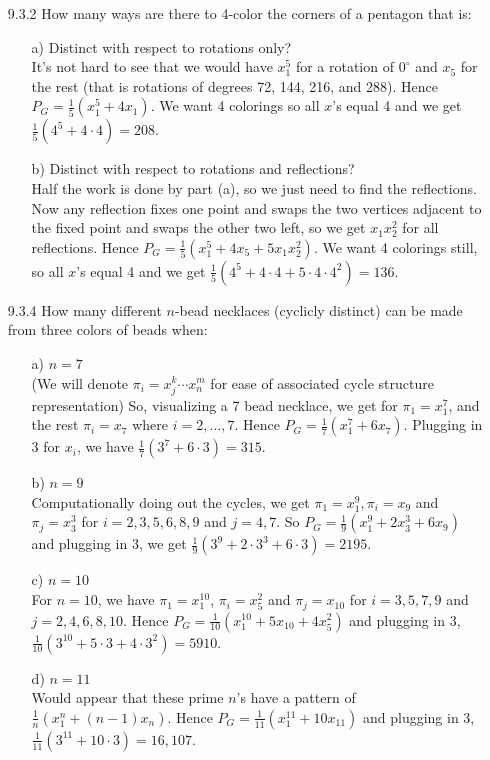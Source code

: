 \documentclass[12pt]{article}
\begin{document}
\begin{enumerate}
\item[9.3.2] How many ways are there to 4-color the corners of a pentagon that is:
\begin{enumerate}
\item[a)] Distinct with respect to rotations only? \\
It's not hard to see that we would have $x_1^5$ for a rotation of 
$0^{\circ}$ and $x_5$ for the rest (that is rotations of degrees 72, 144, 216, and 288).
Hence $P_G = \frac{1}{5}(x_1^5 + 4x_1)$. We want 4 colorings so all $x$'s equal 4 and we get
$\frac{1}{5}(4^5 + 4 \cdot 4) = 208$.
\item[b)] Distinct with respect to rotations and reflections? \\
Half the work is done by part (a), so we just need to find the reflections. 
Now any reflection fixes one point and swaps the two vertices adjacent to the fixed point
and swaps the other two left, so we get $x_1x_2^2$ for all reflections. Hence
$P_G = \frac{1}{5}(x_1^5 + 4x_5 + 5x_1x_2^2)$. We want 4 colorings still, so all $x$'s 
equal 4 and we get $\frac{1}{5}(4^5 + 4 \cdot 4 + 5 \cdot 4 \cdot 4^2) = 136$.
\end{enumerate}

\item[9.3.4] How many different $n$-bead necklaces (cyclicly distinct) can be made from three colors of beads when:
\begin{enumerate}
\item[a)] $n = 7$ \\
(We will denote $\pi_i = x_j^k\cdots x_n^m$ for ease of associated
cycle structure representation)
So, visualizing a 7 bead necklace, we get for $\pi_1 = x_1^7$, 
and the rest $\pi_i = x_7$ where $i = 2, \ldots, 7$. Hence
$P_G = \frac{1}{7}(x_1^7 + 6x_7)$. Plugging in 3 for $x_i$, we have
$\frac{1}{7}(3^7 + 6\cdot 3) = 315$.
\item[b)] $n = 9$ \\
Computationally doing out the cycles, we get $\pi_1 = x_1^9, 
\pi_i = x_9$ and $\pi_j = x_3^3$ for $i = 2, 3, 5, 6, 8, 9$ and
$j = 4, 7$. So $P_G = \frac{1}{9}(x_1^9 + 2x_3^3 + 6x_9)$ and plugging in 3, we get
$\frac{1}{9}(3^9 + 2\cdot 3^3 + 6\cdot 3) = 2195$.
\item[c)] $n = 10$ \\
For $n = 10$, we have
$\pi_1 = x_1^{10}$, $\pi_i = x^2_5$ and $\pi_j = x_{10}$ for $i = 3, 5, 7, 9$ and
$j = 2, 4, 6, 8, 10$. Hence $P_G = \frac{1}{10}(x_1^{10} + 5x_{10} + 4x_5^2)$ and
plugging in 3, $\frac{1}{10}(3^{10} + 5\cdot 3 + 4\cdot 3^2) = 5910$.
\item[d)] $n = 11$ \\
Would appear that these prime $n$'s have a pattern of 
$\frac{1}{n}(x_1^n + (n-1)x_n)$. Hence $P_G = \frac{1}{11}(x_1^{11} + 10x_{11})$ and
plugging in 3, $\frac{1}{11}(3^11 + 10 \cdot 3) = 16,107$.
\end{enumerate}


\end{enumerate}
\end{document}
